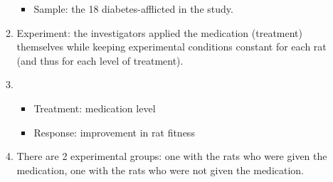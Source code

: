 \documentclass{article}
\begin{document}
\begin{enumerate}
\begin{enumerate}
{\begin{itemize}
\item Sample: the 18 diabetes-afflicted in the study.
\end{itemize}}
\item
{\color{red} Experiment: the investigators applied the medication (treatment) themselves while keeping experimental conditions constant for each rat (and thus for each level of treatment).}
\item
{\color{red}
\begin{itemize}
\item Treatment: medication level
\item Response: improvement in rat fitness 
\end{itemize}}

\item
{\color{red} There are 2 experimental groups: one with the rats who were given the medication, one with the rats who were not given the medication. }
\end{enumerate}
\end{enumerate}




% 
%
\end{document}
